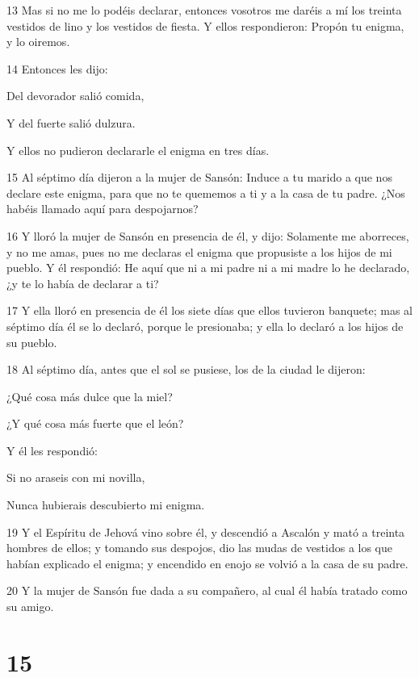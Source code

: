 \par 13 Mas si no me lo podéis declarar, entonces vosotros me daréis a mí los treinta vestidos de lino y los vestidos de fiesta. Y ellos respondieron: Propón tu enigma, y lo oiremos.
\par 14 Entonces les dijo:
\par Del devorador salió comida,
\par Y del fuerte salió dulzura.
\par Y ellos no pudieron declararle el enigma en tres días.
\par 15 Al séptimo día dijeron a la mujer de Sansón: Induce a tu marido a que nos declare este enigma, para que no te quememos a ti y a la casa de tu padre. ¿Nos habéis llamado aquí para despojarnos?
\par 16 Y lloró la mujer de Sansón en presencia de él, y dijo: Solamente me aborreces, y no me amas, pues no me declaras el enigma que propusiste a los hijos de mi pueblo. Y él respondió: He aquí que ni a mi padre ni a mi madre lo he declarado, ¿y te lo había de declarar a ti?
\par 17 Y ella lloró en presencia de él los siete días que ellos tuvieron banquete; mas al séptimo día él se lo declaró, porque le presionaba; y ella lo declaró a los hijos de su pueblo.
\par 18 Al séptimo día, antes que el sol se pusiese, los de la ciudad le dijeron:
\par ¿Qué cosa más dulce que la miel?
\par ¿Y qué cosa más fuerte que el león?
\par Y él les respondió:
\par Si no araseis con mi novilla,
\par Nunca hubierais descubierto mi enigma.
\par 19 Y el Espíritu de Jehová vino sobre él, y descendió a Ascalón y mató a treinta hombres de ellos; y tomando sus despojos, dio las mudas de vestidos a los que habían explicado el enigma; y encendido en enojo se volvió a la casa de su padre.
\par 20 Y la mujer de Sansón fue dada a su compañero, al cual él había tratado como su amigo.

\chapter{15}

